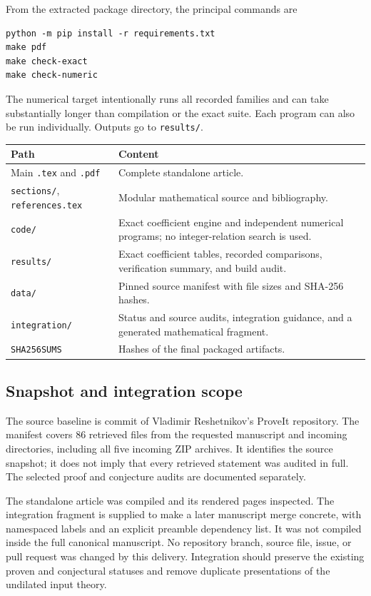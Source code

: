 From the extracted package directory, the principal commands are
\begin{verbatim}
python -m pip install -r requirements.txt
make pdf
make check-exact
make check-numeric
\end{verbatim}
The numerical target intentionally runs all recorded families and can
take substantially longer than compilation or the exact suite. Each
program can also be run individually. Outputs go to \texttt{results/}.
\begin{center}
\begin{tabularx}{\textwidth}{@{}>{\raggedright\arraybackslash}p{}Y@{}}
\toprule
Path & Content\\
\midrule
Main \texttt{.tex} and \texttt{.pdf} & Complete standalone article.\\
\texttt{sections/}, \texttt{references.tex} & Modular mathematical source
and bibliography.\\
\texttt{code/} & Exact coefficient engine and independent numerical
programs; no integer-relation search is used.\\
\texttt{results/} & Exact coefficient tables, recorded comparisons,
verification summary, and build audit.\\
\texttt{data/} & Pinned source manifest with file sizes and SHA-256
hashes.\\
\texttt{integration/} & Status and source audits, integration guidance,
and a generated mathematical fragment.\\
\texttt{SHA256SUMS} & Hashes of the final packaged artifacts.\\
\bottomrule
\end{tabularx}
\end{center}

\subsection{Snapshot and integration scope}

The source baseline is commit
 of
Vladimir Reshetnikov's ProveIt repository. The manifest covers $86$
retrieved files from the requested manuscript and incoming directories,
including all five incoming ZIP archives. It identifies the source
snapshot; it does not imply that every retrieved statement was audited
in full. The selected proof and conjecture audits are documented
separately.

The standalone article was compiled and its rendered pages inspected.
The integration fragment is supplied to make a later manuscript merge
concrete, with namespaced labels and an explicit preamble dependency
list. It was not compiled inside the full canonical manuscript. No
repository branch, source file, issue, or pull request was changed by
this delivery. Integration should preserve the existing proven and
conjectural statuses and remove duplicate presentations of the
undilated input theory.
